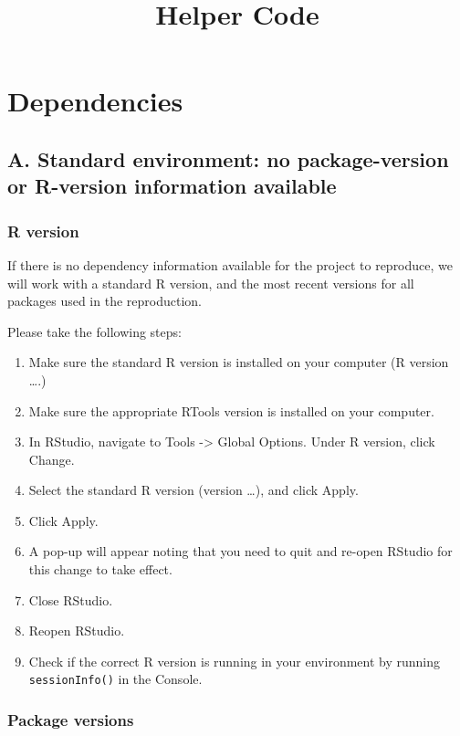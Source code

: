 \documentclass[
  letterpaper,
  DIV=11,
  numbers=noendperiod]{scrartcl}
\title{Helper Code}
\author{}
\date{}
\providecommand{\tightlist}{%
  \setlength{\itemsep}{0pt}\setlength{\parskip}{0pt}}\usepackage{longtable,booktabs,array}
\begin{document}
\maketitle


\section{Dependencies}\label{dependencies}

\subsection{A. Standard environment: no package-version or R-version
information
available}\label{a.-standard-environment-no-package-version-or-r-version-information-available}

\subsubsection{R version}\label{r-version}

If there is no dependency information available for the project to
reproduce, we will work with a standard R version, and the most recent
versions for all packages used in the reproduction.

Please take the following steps:

\begin{enumerate}
\def\labelenumi{\arabic{enumi}.}
\tightlist
\item
  Make sure the standard R version is installed on your computer (R
  version \ldots.)
\item
  Make sure the appropriate RTools version is installed on your
  computer.
\item
  In RStudio, navigate to Tools -\textgreater{} Global Options. Under R
  version, click Change.
\item
  Select the standard R version (version \ldots), and click Apply.
\item
  Click Apply.
\item
  A pop-up will appear noting that you need to quit and re-open RStudio
  for this change to take effect.
\item
  Close RStudio.
\item
  Reopen RStudio.
\item
  Check if the correct R version is running in your environment by
  running \texttt{sessionInfo()} in the Console.
\end{enumerate}

\subsubsection{Package versions}\label{package-versions}
\end{document}
